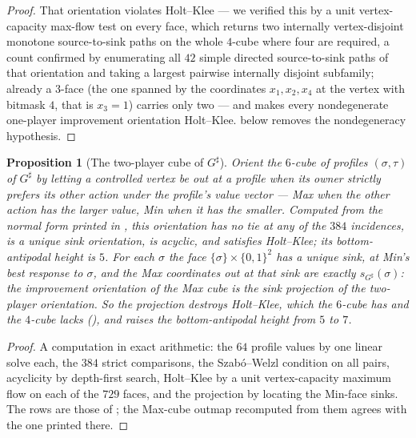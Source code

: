 \documentclass[11pt]{article}
\theoremstyle{plain}
\newtheorem{proposition}[theorem]{Proposition}
\theoremstyle{definition}
\begin{document}
\begin{proof}
That orientation violates Holt--Klee --- we verified this by a unit
vertex-capacity max-flow test on every face, which returns two
internally vertex-disjoint monotone source-to-sink paths on the whole
$4$-cube where four are required, a count confirmed by enumerating all
$42$ simple directed source-to-sink paths of that orientation and taking
a largest pairwise internally disjoint subfamily; already a $3$-face
(the one spanned by the coordinates $x_1,x_2,x_4$ at the vertex with
bitmask $4$, that is $x_3=1$) carries only two --- and
 makes every nondegenerate one-player improvement
orientation Holt--Klee.  below removes the
nondegeneracy hypothesis.
\end{proof}

\begin{proposition}[The two-player cube of $G^{\sharp}$]\label{prop:gsharp-bigcube}
Orient the $6$-cube of profiles $(\sigma,\tau)$ of $G^{\sharp}$ by letting a
controlled vertex be \emph{out} at a profile when its owner strictly prefers
its other action under the profile's value vector --- Max when the other
action has the larger value, Min when it has the smaller. Computed from the
normal form printed in , this orientation has no tie
at any of the $384$ incidences, is a unique sink orientation, is acyclic,
and satisfies Holt--Klee; its bottom-antipodal height is $5$. For each
$\sigma$ the face $\{\sigma\}\times\{0,1\}^{2}$ has a unique sink, at
Min's best response to $\sigma$, and the Max coordinates out at that sink
are exactly $s_{G^{\sharp}}(\sigma)$: the improvement orientation of the
Max cube is the sink projection of the two-player orientation. So the
projection destroys Holt--Klee, which the $6$-cube has and the $4$-cube
lacks (), and raises the bottom-antipodal height
from $5$ to $7$.
\end{proposition}

\begin{proof}
A computation in exact arithmetic: the $64$ profile values by one linear
solve each, the $384$ strict comparisons, the Szab\'o--Welzl condition on
all pairs, acyclicity by depth-first search, Holt--Klee by a unit
vertex-capacity maximum flow on each of the $729$ faces, and the projection
by locating the Min-face sinks. The rows are those of
; the Max-cube outmap recomputed from them agrees
with the one printed there.
\end{proof}
\end{document}
